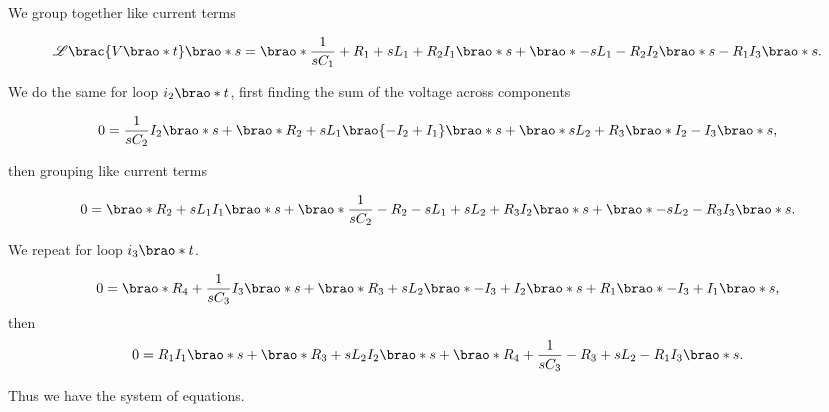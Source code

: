 \documentclass[12pt]{article}
\DeclarePairedDelimiter\brao()%
\DeclarePairedDelimiter\brac[]%
\begin{document}
We group together like current terms

\begin{equation}
    \mathscr{L}\brac{V\brao*t}\brao*s = \brao*{\frac1{sC_1} + R_1 + sL_1 + R_2} I_1\brao*s + \brao*{-sL_1 - R_2} I_2\brao*s - R_1 I_3\brao*s.
\end{equation}

We do the same for loop $i_2\brao*t$, first finding the sum of the voltage across components

\begin{equation}
    0 = \frac1{sC_2} I_2\brao*s +\brao*{R_2 + sL_1}\brao{-I_2 + I_1}\brao*s + \brao*{sL_2 + R_3}\brao*{I_2 - I_3}\brao*s,
\end{equation}

then grouping like current terms

\begin{equation}
    0 = \brao*{R_2 + sL_1}I_1\brao*s + \brao*{\frac1{sC_2} - R_2 - sL_1 + sL_2 + R_3} I_2\brao*s + \brao*{-sL_2 - R_3}I_3\brao*s.
\end{equation}

We repeat for loop $i_3\brao*t$.

\begin{equation}
    0 = \brao*{R_4 + \frac1{sC_3}} I_3\brao*s + \brao*{R_3 + sL_2}\brao*{-I_3 + I_2}\brao*s + R_1\brao*{-I_3 + I_1}\brao*s,
\end{equation}
then
\begin{equation}
    0 = R_1 I_1\brao*s + \brao*{R_3 + sL_2}I_2\brao*s + \brao*{R_4 + \frac1{sC_3} - R_3 + sL_2 - R_1}I_3\brao*s.
\end{equation}

Thus we have the system of equations.
\end{document}
